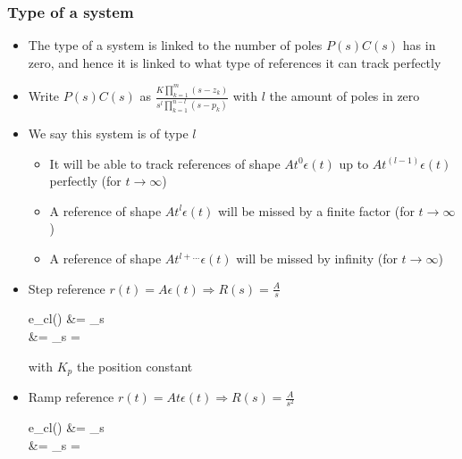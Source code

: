\begin{frame}
	\frametitle{Type of a system}
	\begin{itemize}
		\item The type of a system is linked to the number of poles $P(s)C(s)$ has in zero, and hence it is linked to what type of references it can track perfectly
		\item Write $P(s)C(s)$ as $\frac{K \prod_{k=1}^{m} (s-z_k)}{s^l \prod_{k=1}^{n-l} (s-p_k)}$ with $l$ the amount of poles in zero
		\item We say this system is of type $l$
		\begin{itemize}
			\item It will be able to track references of shape $At^0 \epsilon(t)$ up to $At^{(l - 1)} \epsilon(t)$ perfectly (for $t\rightarrow \infty$)
			\item A reference of shape $At^l \epsilon(t)$ will be missed by a finite factor (for $t\rightarrow \infty$)
			\item A reference of shape $At^{l+...} \epsilon(t)$ will be missed by infinity (for $t\rightarrow \infty$)
		\end{itemize}
	\end{itemize}
\end{frame}

\begin{frame}
	\begin{itemize}
		\item Step reference $r(t) = A \epsilon (t) \Rightarrow R(s) = \frac{A}{s}$
		\begin{flalign*}
			e_{cl}(\infty) &= \lim\limits_{s }   \\
			&= \lim\limits_{s } 
			= 
		\end{flalign*}
		with $K_p$ the position constant
		\item Ramp reference $r(t) = At \epsilon (t) \Rightarrow R(s) = \frac{A}{s^2	}$
		\begin{flalign*}
			e_{cl}(\infty) &= \lim\limits_{s }  \frac{A}{s^2} \\
			&= \lim\limits_{s }  = \infty
		\end{flalign*}
	\end{itemize}
\end{frame}	

